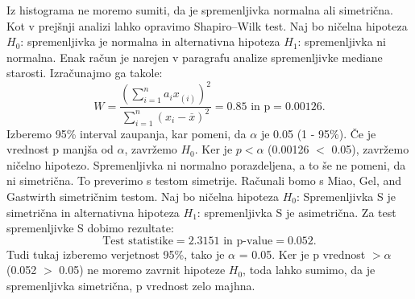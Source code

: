 \documentclass[a4paper,11pt]{article}
\begin{document}
Iz histograma ne moremo sumiti, da je spremenljivka normalna ali simetrična. Kot v prejšnji analizi lahko opravimo Shapiro–Wilk test. Naj bo ničelna hipoteza \(H_0\): spremenljivka je normalna in alternativna hipoteza \(H_1\): spremenljivka ni normalna. Enak račun je narejen v paragrafu analize spremenljivke mediane starosti. Izračunajmo ga takole:
\[W = \frac{(\sum_{i = 1}^{n}a_i x_{(i)})^2}{\sum_{i = 1}^{n}(x_i - \overset{\_}{x})^2} = 0.85 \text{ in p} = 0.00126. \]
Izberemo 95\% interval zaupanja, kar pomeni, da \(\alpha\) je 0.05 (1 - 95\%). Če je vrednost p manjša od \(\alpha\), zavržemo \(H_0\). Ker je \(p < \alpha\) (0.00126 \(<\) 0.05), zavržemo ničelno hipotezo. Spremenljivka ni normalno porazdeljena, a to še ne pomeni, da ni simetrična. To preverimo s testom simetrije. Računali bomo s Miao, Gel, and Gastwirth simetričnim testom. Naj bo ničelna hipoteza \(H_0\): Spremenljivka S je simetrična in alternativna hipoteza \(H_1\): spremenljivka S je asimetrična. Za test spremenljivke S dobimo rezultate:
\[\text{Test statistike} = 2.3151 \text{ in p-value} = 0.052.\]
Tudi tukaj izberemo verjetnost 95\%, tako je \(\alpha\) = 0.05. Ker je p vrednost \(> \alpha\) (0.052 \(>\) 0.05) ne moremo zavrnit hipoteze \(H_0\), toda lahko sumimo, da je spremenljivka simetrična, p vrednost zelo majhna.
\end{document}
